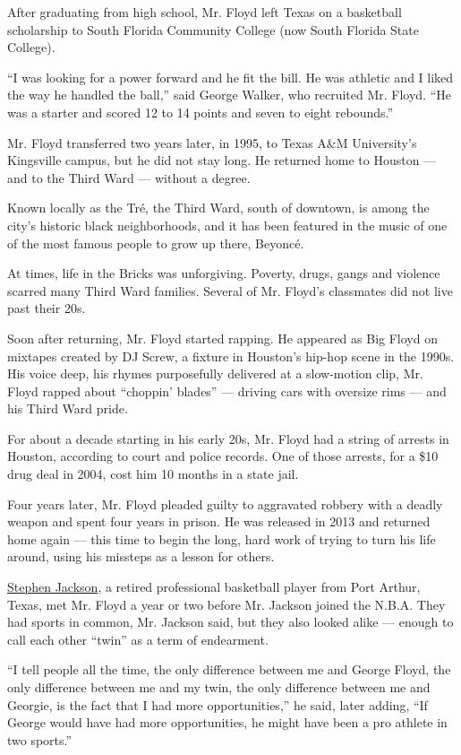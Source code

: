 After graduating from high school, Mr. Floyd left Texas on a basketball
scholarship to South Florida Community College (now South Florida State
College).

``I was looking for a power forward and he fit the bill. He was athletic
and I liked the way he handled the ball,'' said George Walker, who
recruited Mr. Floyd. ``He was a starter and scored 12 to 14 points and
seven to eight rebounds.''

Mr. Floyd transferred two years later, in 1995, to Texas A\&M
University's Kingsville campus, but he did not stay long. He returned
home to Houston --- and to the Third Ward --- without a degree.

Known locally as the Tré, the Third Ward, south of downtown, is among
the city's historic black neighborhoods, and it has been featured in the
music of one of the most famous people to grow up there, Beyoncé.

At times, life in the Bricks was unforgiving. Poverty, drugs, gangs and
violence scarred many Third Ward families. Several of Mr. Floyd's
classmates did not live past their 20s.

Soon after returning, Mr. Floyd started rapping. He appeared as Big
Floyd on mixtapes created by DJ Screw, a fixture in Houston's hip-hop
scene in the 1990s. His voice deep, his rhymes purposefully delivered at
a slow-motion clip, Mr. Floyd rapped about ``choppin' blades'' ---
driving cars with oversize rims --- and his Third Ward pride.

For about a decade starting in his early 20s, Mr. Floyd had a string of
arrests in Houston, according to court and police records. One of those
arrests, for a \$10 drug deal in 2004, cost him 10 months in a state
jail.

Four years later, Mr. Floyd pleaded guilty to aggravated robbery with a
deadly weapon and spent four years in prison. He was released in 2013
and returned home again --- this time to begin the long, hard work of
trying to turn his life around, using his missteps as a lesson for
others.

\href{https://www.nytimes.com/2020/06/11/sports/basketball/stephen-jackson-george-floyd-protests.html}{Stephen
Jackson}, a retired professional basketball player from Port Arthur,
Texas, met Mr. Floyd a year or two before Mr. Jackson joined the N.B.A.
They had sports in common, Mr. Jackson said, but they also looked alike
--- enough to call each other ``twin'' as a term of endearment.

``I tell people all the time, the only difference between me and George
Floyd, the only difference between me and my twin, the only difference
between me and Georgie, is the fact that I had more opportunities,'' he
said, later adding, ``If George would have had more opportunities, he
might have been a pro athlete in two sports.''

